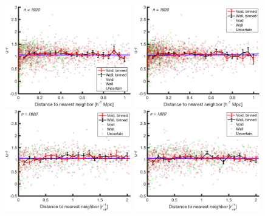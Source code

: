 \begin{figure}
    \includegraphics[width=0.49\textwidth]{Images/smallScaleEnvironment/1sig_dwarf_I06relations_absDist150_ur}
    \includegraphics[width=0.49\textwidth]{Images/smallScaleEnvironment/1sig_dwarf_I06relations_absDist600_ur}
    \includegraphics[width=0.49\textwidth]{Images/smallScaleEnvironment/1sig_dwarf_I06relations_virDist150_ur}
    \includegraphics[width=0.49\textwidth]{Images/smallScaleEnvironment/1sig_dwarf_I06relations_virDist600_ur}

\end{figure}
